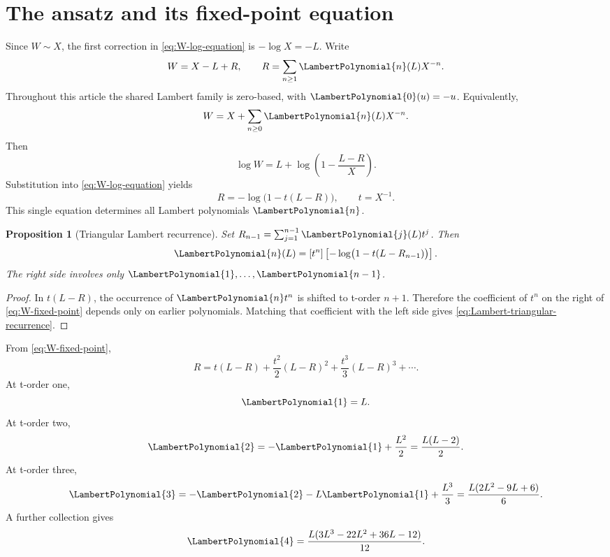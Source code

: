 \documentclass[11pt,openany]{book}
\theoremstyle{definition}
\theoremstyle{plain}
\newtheorem{proposition}{Proposition}[chapter]
\theoremstyle{remark}
\begin{document}
\section{The ansatz and its fixed-point equation}
Since \(W\sim X\), the first correction in \cref{eq:W-log-equation} is
\(-\log X=-L\).  Write
\begin{equation}\label{eq:W-ansatz}
 W=X-L+R,
 \qquad
 R=\sum_{n\ge1}\LambertPolynomial{n}(L)X^{-n}.
\end{equation}
Throughout this article the shared Lambert family is zero-based, with
\(\LambertPolynomial{0}(u)=-u\).  Equivalently,
\[
 W=X+\sum_{n\ge0}\LambertPolynomial{n}(L)X^{-n}.
\]
Then
\[
 \log W
 =L+\log\!\left(1-\frac{L-R}{X}\right).
\]
Substitution into \cref{eq:W-log-equation} yields
\begin{equation}\label{eq:W-fixed-point}
 R=-\log\bigl(1-t(L-R)\bigr),
 \qquad t=X^{-1}.
\end{equation}
This single equation determines all Lambert polynomials \(\LambertPolynomial{n}\).

\begin{proposition}[Triangular Lambert recurrence]\label{prop:Lambert-triangular}
Set \(R_{n-1}=\sum_{j=1}^{n-1}\LambertPolynomial{j}(L)t^j\).  Then
\begin{equation}\label{eq:Lambert-triangular-recurrence}
 \LambertPolynomial{n}(L)=[t^n]\left[-\log\bigl(1-t(L-R_{n-1})\bigr)\right].
\end{equation}
The right side involves only \(\LambertPolynomial{1},\ldots,\LambertPolynomial{n-1}\).
\end{proposition}
\begin{proof}
In \(t(L-R)\), the occurrence of \(\LambertPolynomial{n}t^n\) is shifted to t-order \(n+1\).
Therefore the coefficient of \(t^n\) on the right of
\cref{eq:W-fixed-point} depends only on earlier polynomials.  Matching that
coefficient with the left side gives \cref{eq:Lambert-triangular-recurrence}.
\end{proof}

\begin{workedbox}[title={The first four Lambert polynomials}]
From \cref{eq:W-fixed-point},
\[
 R=t(L-R)+\frac{t^2}{2}(L-R)^2
   +\frac{t^3}{3}(L-R)^3+\cdots.
\]
At t-order one,
\[
 \LambertPolynomial{1}=L.
\]
At t-order two,
\[
 \LambertPolynomial{2}=-\LambertPolynomial{1}+\frac{L^2}{2}
 =\frac{L(L-2)}2.
\]
At t-order three,
\[
 \LambertPolynomial{3}=-\LambertPolynomial{2}-L\LambertPolynomial{1}+\frac{L^3}{3}
 =\frac{L(2L^2-9L+6)}6.
\]
A further collection gives
\[
 \LambertPolynomial{4}=\frac{L(3L^3-22L^2+36L-12)}{12}.
\]
\end{workedbox}
\end{document}
